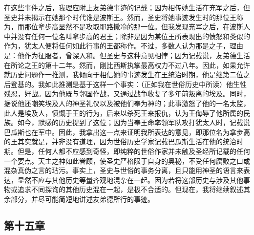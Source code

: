 在这些事件之后，我理应附上友弟德事迹的记载；因为相传她生活在充军之后，但圣史并未揭示在她那个时代谁是波斯王。然而，圣史将她事迹发生时的那位王称为，而那位拿步高显然不是攻取耶路撒冷的那一位。但我发现充军之后，在波斯人中并没有任何一位名叫拿步高的君王；除非是因为某位王所表现出的愤怒和类似的作为，犹太人便将任何如此行事的王都称作。不过，多数人认为那是之子，理由是：他作为征服者，曾深入和。但圣史与这种意见相悖；因为记载说，友弟德生活在所论之王的第十二年。然而，刚比西斯执掌最高权力不过八年。因此，如果允许就历史问题作一推测，我倾向于相信她的事迹发生在王统治时期，他是继第二位之后登基的。我如此推测是基于这样一个事实：（正如我在世俗历史中所读）他生性残忍，好战。因为他既与邻国作战，又通过战争收复了多年前叛离的埃及。同时，据说他还嘲笑埃及人的神圣礼仪以及被他们奉为神的；此事激怒了他的一名太监，此人是埃及人，愤慨于王的行为，后来以杀死王来报仇，认为王侮辱了他所属的民族。如今，默感的历史提到了这位；因为当奉王命率领军队攻打犹太人时，记载说巴瓜斯也在军中。因此，我拿出这一点来证明我所表达的意见，即那位名为拿步高的王其实就是，并非没有道理，因为世俗历史学家记载巴瓜斯生活在他的统治时期。但是，任何人都不应感到奇怪，即纯粹的世俗作家并未触及圣经所记载的任何一个要点。天主之神如此眷顾，使圣史严格限于自身的奥秘，不受任何腐败之口或混杂真伪之言的玷污。事实上，圣史与世俗的事务分离，且只能用神圣的语言来表达，显然不应与其他历史等量齐观地混杂在一起。因为若将这部历史与涉及其他事物或追求不同探询的其他历史混在一起，是极不合适的。但现在，我将继续叙述其余部分，并尽可能简短地讲述友弟德所行的事迹。\par


\subsection{第十五章}

